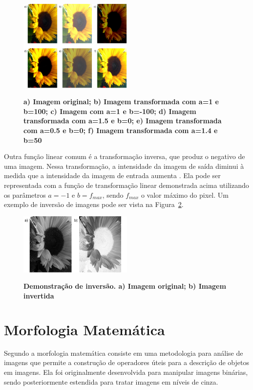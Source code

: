 \documentclass[12pt,oneside,a4paper,english,french,spanish,brazil,]{abntex2}
\begin{document}
\begin{figure}[ht]
\centering
\caption{\textbf{a) Imagem original; b) Imagem transformada com a=1 e b=100; c) Imagem com a=1 e b=-100; d) Imagem transformada com a=1.5 e b=0; e) Imagem transformada com a=0.5 e b=0; f) Imagem transformada com a=1.4 e b=50}}
\includegraphics[width=0.5\textwidth]{imagens/PDI_Brilho_e_Contraste.pdf}
\sourceAuthor
\label{fig:PDI_Brilho_e_Contraste}
\end{figure}

Outra função linear comum é a transformação inversa, que produz o negativo de uma imagem. Nessa transformação, a intensidade da imagem de saída diminui à medida que a intensidade da imagem de entrada aumenta \cite{pedrini:2008}. Ela pode ser representada com a função de transformação linear demonstrada acima utilizando os parâmetros \(a=-1\) e \(b=f_{max}\), sendo \(f_{max}\) o valor máximo do pixel. Um exemplo de inversão de imagens pode ser vista na Figura~\ref{fig:PDI_Inversao}.

\begin{figure}[ht]
\centering
\caption{\textbf{Demonstração de inversão. a) Imagem original; b) Imagem invertida}}
\includegraphics[width=0.5\textwidth]{imagens/PDI_Inversao.pdf}
\sourceAuthor
\label{fig:PDI_Inversao}
\end{figure}

\section{Morfologia Matemática}

Segundo \citet{pedrini:2008} a morfologia matemática consiste em uma metodologia para análise de imagens que permite a construção de operadores úteis para a descrição de objetos em imagens. Ela foi originalmente desenvolvida para manipular imagens binárias, sendo posteriormente estendida para tratar imagens em níveis de cinza.
\end{document}
